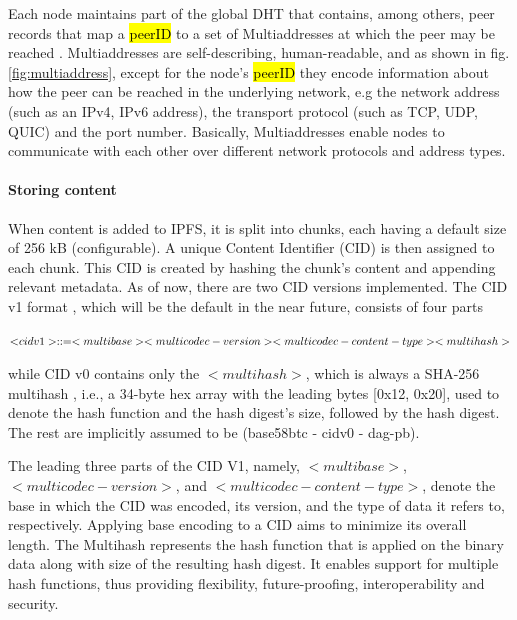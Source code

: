 Each node maintains part of the global DHT that contains, among others, peer records that map a \hl{peerID} to a set of Multiaddresses at which the peer may be reached \citep{schmahmann_2020}. Multiaddresses \citep{multiaddress_2023} are self-describing, human-readable, and as shown in fig. \ref{fig:multiaddress}, except for the node's \hl{peerID} they encode information about how the peer can be reached in the underlying network, e.g the network address (such as an IPv4, IPv6 address), the transport protocol (such as TCP, UDP, QUIC) and the port number. Basically, Multiaddresses enable nodes to communicate with each other over different network protocols and address types.

\paragraph{Storing content}\label{par:storing_ipfs}
When content is added to IPFS, it is split into chunks, each having a default size of 256 kB (configurable). A unique Content Identifier (CID) is then assigned to each chunk. This CID is created by hashing the chunk's content and appending relevant metadata. As of now, there are two CID versions implemented. The CID v1 format \citep{multiformat}, which will be the default in the near future, consists of four parts


\begin{flushleft}
\centering
$\textsc <cidv1> ::= <multibase><multicodec-version><multicodec-content-type><multihash>$
\end{flushleft}

while CID v0 contains only the \(\scriptstyle <multihash>\), which is always a SHA-256 multihash \citep{multiformat}, i.e., a 34-byte hex array with the leading bytes [0x12, 0x20], used to denote the hash function and the hash digest’s size, followed by the hash digest. The rest are implicitly assumed to be (base58btc - cidv0 - dag-pb).

The leading three parts of the CID V1, namely, \(\scriptstyle <multibase>\), \(\scriptstyle <multicodec-version>\), and \(\scriptstyle <multicodec-content-type>\), denote the base in which the CID was encoded, its version, and the type of data it refers to, respectively. Applying base encoding to a CID aims to minimize its overall length. The Multihash represents the hash function that is applied on the binary data along with size of the resulting hash digest. It enables support for multiple hash functions, thus providing flexibility, future-proofing, interoperability and security. %

